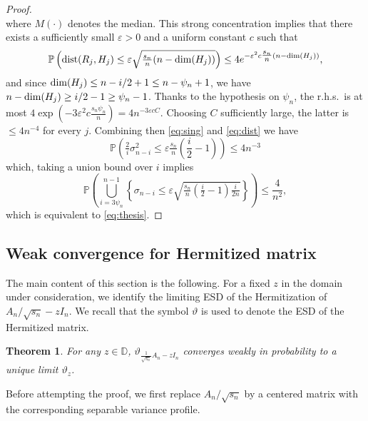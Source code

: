 \documentclass[11pt,oneside]{amsart}
\theoremstyle{plain}
\newtheorem{theorem}{Theorem}[section]
\numberwithin{equation}{section}
\newcommand{\red}{\color{red}}
\newcommand{\rhs}{{r.h.s.~}}
\newcommand{\eps}{\varepsilon}
\newcommand{\p}{\mathbb{P}}
\newcommand{\scaling}{s_n}
\newcommand{\thetalimit}{\vartheta_z}
\begin{document}
\begin{proof}
\begin{equation}
    \end{equation}
    where $M(\cdot)$ denotes the median. This strong concentration implies that there exists a sufficiently small $\eps>0$ and a uniform constant $c$ such that
    \begin{equation} \label{eq:dist}
        \p\left({\rm dist}(R_j,H_j) \le \eps \sqrt{\tfrac{\scaling}{n}(n-{\rm dim}(H_j))}\right)
     \le 4 e^{-\eps^2c\tfrac{\scaling}{n}(n-{\rm dim}(H_j))},
    \end{equation}
    and since ${\rm dim} (H_j) \le n-i/2+1\le  n-\psi_n+1$, we have $n-{\rm dim}(H_j) \ge i/2-1\ge \psi_n -1$. Thanks to the hypothesis on $\psi_n$, the \rhs is at most $4\exp(-3\eps^2c \tfrac{\scaling\psi_n}{n})=4n^{-3\eps cC}$. Choosing $C$ sufficiently large, the latter is $\le 4n^{-4}$ for every $j$. Combining then \eqref{eq:sing} and \eqref{eq:dist} we have
    \begin{equation}
        \p\left({\tfrac{2}{i}}\sigma_{n-i}^{2}\le {\eps {\tfrac{\scaling}{n}(\frac{i}{2}-1)}}\right) \le 4n^{-3}
    \end{equation}
    which, taking a union bound over $i$ implies
    \begin{equation}
        \p\left(\bigcup_{i=3\psi_n}^{n-1}\left\{\sigma_{n-i}\le {\eps \sqrt{\tfrac{\scaling}{n}(\tfrac{i}{2}-1)\tfrac{i}{2n}}}\right\}\right)\le \frac{4}{n^2},
    \end{equation}
     which is equivalent to \eqref{eq:thesis}. 
\end{proof}

\subsection{Weak convergence for Hermitized matrix}
\label{sec:weak-conv}
The main content of this section is the following. For a fixed $z$ in the domain under consideration, we identify the limiting ESD of the Hermitization of $A_n/\sqrt{\scaling}- zI_n$. We recall that the symbol $\vartheta$ is used to denote the ESD of the Hermitized matrix.

\begin{theorem} \label{thm:weak-conv}
For any $z \in \mathbb{D}$, $\vartheta_{\tfrac{1}{\sqrt{\scaling}}{A}_n-zI_n}$ converges weakly in probability to a unique limit $\thetalimit$.
\end{theorem}
Before attempting the proof, we first replace ${A}_n/\sqrt{\scaling}$ by a centered matrix with the corresponding separable variance profile.
\end{document}
